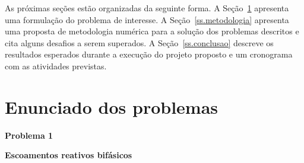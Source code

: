 \documentclass[12pt, brazil]{article}
\begin{document}
As próximas seções estão organizadas da seguinte forma. A Seção~\ref{ss.problema} apresenta uma formulação do problema de interesse. A Seção~\ref{ss.metodologia} apresenta uma proposta de metodologia numérica para a solução dos problemas descritos e cita alguns desafios a serem superados. A Seção~\ref{ss.conclusao} descreve os resultados esperados durante a execução do projeto proposto e um cronograma com as atividades previstas.

\section{Enunciado dos problemas}\label{ss.problema}

\hspace{1pc} {\bf Problema 1}

\hspace{1pc} {\bf Escoamentos reativos bifásicos}
\end{document}
